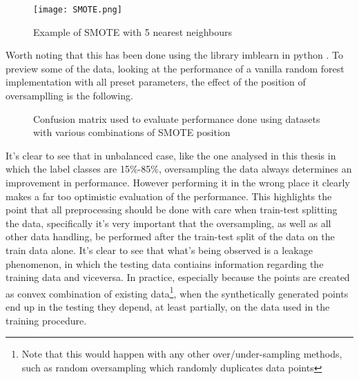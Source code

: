 \begin{figure}[H]
		\centering
  		\texttt{[image: SMOTE.png]}
        \caption{Example of SMOTE with 5 nearest neighbours}
\end{figure}

Worth noting that this has been done using the library imblearn in python \cite{imblearn}. To preview some of the data, looking at the performance of a vanilla random forest implementation with all preset parameters, the effect of the position of oversamplling is the following.


\begin{figure}[H]
\centering
\centering \newline
    \caption{Confusion matrix used to evaluate performance done using datasets with various combinations of SMOTE position  }\label{fig:smote_after}
\end{figure}

It's clear to see that in unbalanced case, like the one analysed in this thesis in which the label classes are 15$\%$-85$\%$, oversampling the data always determines an improvement in performance. However performing it in the wrong place it clearly makes a far too optimistic evaluation of the performance. This highlights the point that all preprocessing should be done with care when train-test splitting the data, specifically it's very important that the oversampling, as well as all other data handling, be performed after the train-test split of the data on the train data alone. It's clear to see that what's being observed is a leakage phenomenon, in which the testing data contiains information regarding the training data and viceversa. In practice, especially because the points are created as convex combination of existing data\footnote{Note that this would happen with any other over/under-sampling methods, such as random oversampling which randomly duplicates data points}, when the synthetically generated points end up in the testing they depend, at least partially, on the data used in the training procedure.

